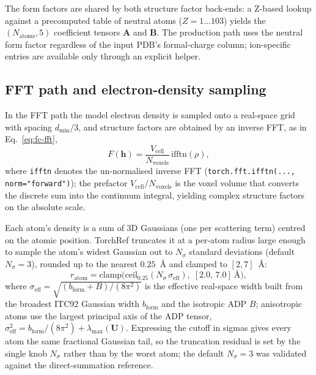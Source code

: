 \documentclass{iucrjournals}
\begin{document}
The form factors are shared by both structure factor back-ends: a Z-based
lookup against a precomputed table of neutral atoms ($Z = 1\ldots103$) yields
the $(N_{\mathrm{atoms}}, 5)$ coefficient tensors $\mathbf{A}$ and
$\mathbf{B}$.  The production path uses the neutral form factor regardless of
the input PDB's formal-charge column; ion-specific entries are available only
through an explicit helper.

\subsection{FFT path and electron-density sampling}

In the FFT path the model electron density is sampled onto a real-space grid
with spacing $d_\mathrm{min}/3$, and structure factors are
obtained by an inverse FFT, as in Eq.~\ref{eq:fc-fft},
%
\begin{equation}
  F(\mathbf{h}) = \frac{V_\mathrm{cell}}{N_\mathrm{voxels}}\,\mathrm{ifftn}(\rho),
  \label{eq:fc-fft}
\end{equation}
%
where \texttt{ifftn} denotes the un-normalised inverse FFT
(\texttt{torch.fft.ifftn(..., norm="forward")}); the prefactor
$V_\mathrm{cell}/N_\mathrm{voxels}$ is the voxel volume that converts the
discrete sum into the continuum integral, yielding complex structure factors
on the absolute scale.

Each atom's density is a sum of 3D Gaussians (one per scattering term) centred
on the atomic position. TorchRef truncates it at a per-atom radius large enough
to sample the atom's widest Gaussian out to $N_{\sigma}$ standard deviations
(default $N_{\sigma} = 3$), rounded up to the nearest $0.25$~\AA{} and clamped
to $[2, 7]$~\AA{}:
%
\begin{equation}
  r_\mathrm{atom} = \mathrm{clamp}\!\bigl(
    \mathrm{ceil}_{0.25}(N_{\sigma}\,\sigma_\mathrm{eff}),\;
    [2.0,\,7.0]~\text{\AA}
  \bigr),
  \label{eq:per-atom-radius}
\end{equation}
%
where $\sigma_\mathrm{eff} = \sqrt{(b_\mathrm{form} + B)/(8\pi^{2})}$ is the
effective real-space width built from the broadest ITC92 Gaussian width
$b_\mathrm{form}$ and the isotropic ADP $B$; anisotropic atoms use the largest
principal axis of the ADP tensor,
$\sigma_\mathrm{eff}^{2} = b_\mathrm{form}/(8\pi^{2}) + \lambda_\mathrm{max}(\mathbf{U})$.
Expressing the cutoff in sigmas gives every atom the same fractional Gaussian
tail, so the truncation residual is set by the single knob $N_{\sigma}$ rather than
by the worst atom; the default $N_{\sigma} = 3$ was validated against the
direct-summation reference.
\end{document}

